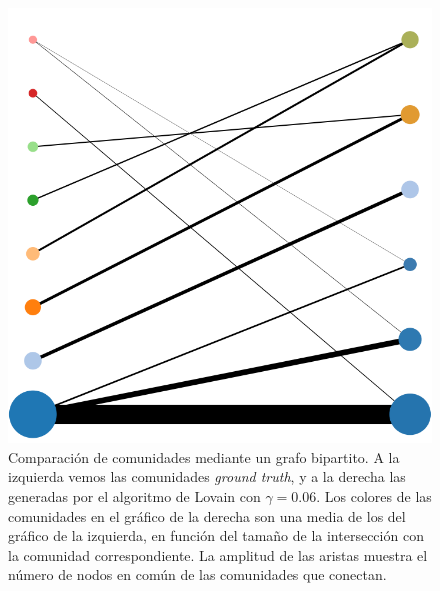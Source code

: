\begin{figure}[!htb]
  \centering
  \includegraphics[width=.7\linewidth]{img/1_best_res_bipartite_comp}
  \caption{Comparación de comunidades mediante un grafo bipartito. A la
    izquierda vemos las comunidades \emph{ground truth}, y a la derecha las
    generadas por el algoritmo de Lovain con \(\gamma=0.06\).  Los colores de
    las comunidades en el gráfico de la derecha son una media de los del
    gráfico de la izquierda, en función del tamaño de la intersección con la
    comunidad correspondiente. La amplitud de las aristas muestra
    el número de nodos en común de las comunidades que conectan.}
  \label{fig:1-best_res_bipartite}
\end{figure}


